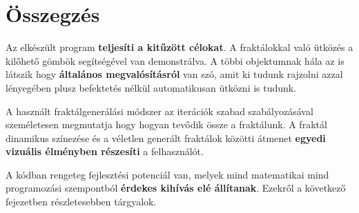 \chapter{Összegzés} %
\label{ch:sum}

Az elkészült program \textbf{teljesíti a kitűzött célokat}. A fraktálokkal való ütközés a kilőhető gömbök segítségével van demonstrálva. A többi objektumnak hála az is látszik hogy \textbf{általános megvalósításról} van szó, amit ki tudunk rajzolni azzal lényegében plusz befektetés nélkül automatikusan ütközni is tudunk. 

A használt fraktálgenerálási módszer az iterációk szabad szabályozásával személetesen megmutatja hogy hogyan tevődik össze a fraktálunk. A fraktál dinamikus színezése és a véletlen generált fraktálok közötti átmenet \textbf{egyedi vizuális élményben részesíti} a felhasználót.

A kódban rengeteg fejlesztési potenciál van, melyek mind matematikai mind programozási szempontból\textbf{ érdekes kihívás elé állítanak}. Ezekről a következő fejezetben részletesebben tárgyalok.